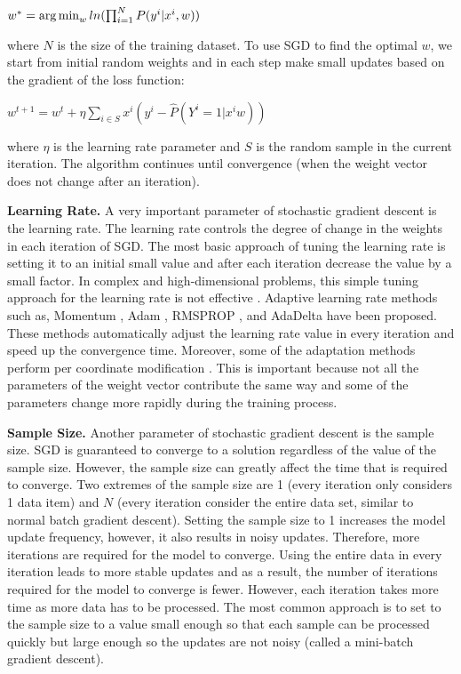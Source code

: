 \begin{center}
$w^* = \operatorname*{arg\,min}_w ln(\prod_{i=1}^{N} P(y^i | x^i, w))$
\end{center}

where $N$ is the size of the training dataset.
To use SGD to find the optimal $w$, we start from initial random weights and in each step make small updates based on the gradient of the loss function:

\begin{center}
${w}^{t+1} = {w}^t + \eta \sum_{i \in S} x^i (y^i - \hat{P}(Y^i = 1 | x^i w))$
\end{center}

where $\eta$ is the learning rate parameter and $S$ is the random sample in the current iteration.
The algorithm continues until convergence (when the weight vector does not change after an iteration).

\textbf{Learning Rate.}
A very important parameter of stochastic gradient descent is the learning rate.
The learning rate controls the degree of change in the weights in each iteration of SGD.
The most basic approach of tuning the learning rate is setting it to an initial small value and after each iteration decrease the value by a small factor.
In complex and high-dimensional problems, this simple tuning approach for the learning rate is not effective \cite{schaul2013no}. 
Adaptive learning rate methods such as, Momentum \cite{qian1999momentum}, Adam \cite{kingma2014adam}, RMSPROP \cite{tieleman2012lecture}, and AdaDelta \cite{zeiler2012adaptive} have been proposed.
These methods automatically adjust the learning rate value in every iteration and speed up the convergence time.
Moreover, some of the adaptation methods perform per coordinate modification \cite{schaul2013no, tieleman2012lecture, zeiler2012adaptive}. 
This is important because not all the parameters of the weight vector contribute the same way and some of the parameters change more rapidly during the training process.

\textbf{Sample Size.}
Another parameter of stochastic gradient descent is the sample size.
SGD is guaranteed to converge to a solution regardless of the value of the sample size.
However, the sample size can greatly affect the time that is required to converge.
Two extremes of the sample size are 1 (every iteration only considers 1 data item) and $N$ (every iteration consider the entire data set, similar to normal batch gradient descent).
Setting the sample size to 1 increases the model update frequency, however, it also results in noisy updates.
Therefore, more iterations are required for the model to converge.
Using the entire data in every iteration leads to more stable updates and as a result, the number of iterations required for the model to converge is fewer.
However, each iteration takes more time as more data has to be processed.
The most common approach is to set to the sample size to a value small enough so that each sample can be processed quickly but large enough so the updates are not noisy (called a mini-batch gradient descent).

